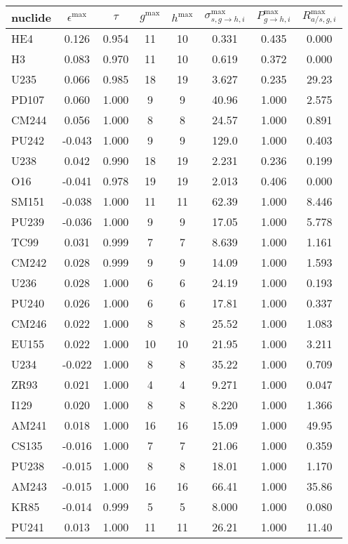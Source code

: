 \begin{tabular}{|l|ccccccc|}
\hline
nuclide & $\epsilon^{\max}$ & $\tau$ & $g^{\max}$ & $h^{\max}$ & $\sigma_{s,g\to h,i}^{\max}$ & $P_{g\to h,i}^{\max}$ & $R_{a/s,g,i}^{\max}$\\
\hline
HE4 & 0.126 & 0.954 & 11 & 10 & 0.331 & 0.435 & 0.000\\
H3 & 0.083 & 0.970 & 11 & 10 & 0.619 & 0.372 & 0.000\\
U235 & 0.066 & 0.985 & 18 & 19 & 3.627 & 0.235 & 29.23\\
PD107 & 0.060 & 1.000 & 9 & 9 & 40.96 & 1.000 & 2.575\\
CM244 & 0.056 & 1.000 & 8 & 8 & 24.57 & 1.000 & 0.891\\
PU242 & -0.043 & 1.000 & 9 & 9 & 129.0 & 1.000 & 0.403\\
U238 & 0.042 & 0.990 & 18 & 19 & 2.231 & 0.236 & 0.199\\
O16 & -0.041 & 0.978 & 19 & 19 & 2.013 & 0.406 & 0.000\\
SM151 & -0.038 & 1.000 & 11 & 11 & 62.39 & 1.000 & 8.446\\
PU239 & -0.036 & 1.000 & 9 & 9 & 17.05 & 1.000 & 5.778\\
TC99 & 0.031 & 0.999 & 7 & 7 & 8.639 & 1.000 & 1.161\\
CM242 & 0.028 & 0.999 & 9 & 9 & 14.09 & 1.000 & 1.593\\
U236 & 0.028 & 1.000 & 6 & 6 & 24.19 & 1.000 & 0.193\\
PU240 & 0.026 & 1.000 & 6 & 6 & 17.81 & 1.000 & 0.337\\
CM246 & 0.022 & 1.000 & 8 & 8 & 25.52 & 1.000 & 1.083\\
EU155 & 0.022 & 1.000 & 10 & 10 & 21.95 & 1.000 & 3.211\\
U234 & -0.022 & 1.000 & 8 & 8 & 35.22 & 1.000 & 0.709\\
ZR93 & 0.021 & 1.000 & 4 & 4 & 9.271 & 1.000 & 0.047\\
I129 & 0.020 & 1.000 & 8 & 8 & 8.220 & 1.000 & 1.366\\
AM241 & 0.018 & 1.000 & 16 & 16 & 15.09 & 1.000 & 49.95\\
CS135 & -0.016 & 1.000 & 7 & 7 & 21.06 & 1.000 & 0.359\\
PU238 & -0.015 & 1.000 & 8 & 8 & 18.01 & 1.000 & 1.170\\
AM243 & -0.015 & 1.000 & 16 & 16 & 66.41 & 1.000 & 35.86\\
KR85 & -0.014 & 0.999 & 5 & 5 & 8.000 & 1.000 & 0.080\\
PU241 & 0.013 & 1.000 & 11 & 11 & 26.21 & 1.000 & 11.40\\

\end{tabular}
